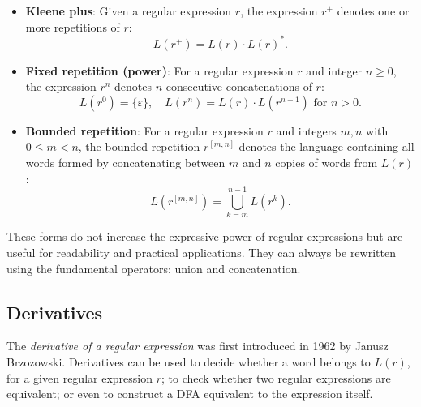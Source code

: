 \begin{itemize}
    \item \textbf{Kleene plus}: Given a regular expression $r$, the expression $r^+$ denotes one or more repetitions of $r$:
    \[
    L(r^+) = L(r) \cdot L(r)^*.
    \]

    \item \textbf{Fixed repetition (power)}: For a regular expression $r$ and integer $n \geq 0$, the expression $r^n$ denotes $n$ consecutive concatenations of $r$:
    \[
    L(r^0) = \{ \varepsilon \}, \quad L(r^n) = L(r) \cdot L(r^{n-1}) \text{ for } n > 0.
    \]

	 \item \textbf{Bounded repetition}: For a regular expression $r$ and integers $m, n$ with $0 \leq m < n$, the bounded repetition $r^{[m,n]}$ denotes the language containing all words formed by concatenating between $m$ and $n$ copies of words from $L(r)$:
    \[
    L(r^{[m,n]}) = \bigcup_{k=m}^{n-1} L(r^k).
    \]
\end{itemize}

These forms do not increase the expressive power of regular expressions but are useful for readability and practical applications. They can always be rewritten using the fundamental operators: union and concatenation.

\subsection{Derivatives}
\label{chap:prelim:derivatives}
The \emph{derivative of a regular expression} was first introduced in 1962 by Janusz Brzozowski.
Derivatives can be used to decide whether a word belongs to $L(r)$, for a given regular expression $r$; to check whether two regular expressions are equivalent; or even to construct a DFA equivalent to the expression itself.

